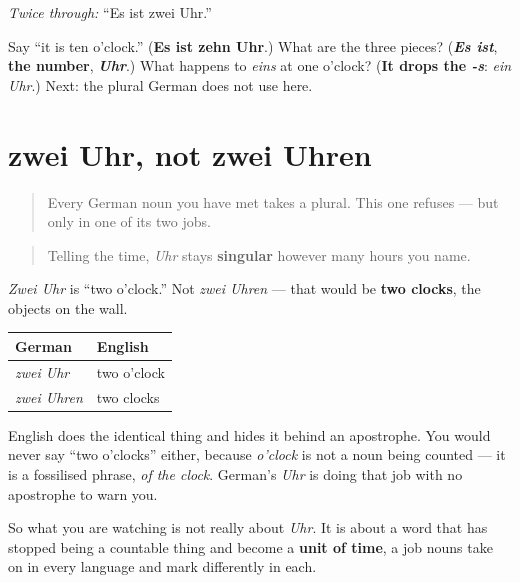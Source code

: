 \emph{Twice through:} \textquotedblleft{}Es ist zwei Uhr.\textquotedblright{}

\begin{tcolorbox}[breakable,colback=teal!4,colframe=teal!35!black,title={Before you move on}]
Say \textquotedblleft{}it is ten o'clock.\textquotedblright{} (\textbf{Es ist zehn Uhr}.) What are the three pieces? (\emph{\textbf{Es ist}}, \textbf{the number}, \emph{\textbf{Uhr}}.) What happens to \emph{eins} at one o'clock? (\textbf{It drops the \emph{-s}}: \emph{ein Uhr}.) Next: the plural German does not use here.
\end{tcolorbox}
\section[zwei Uhr, nicht zwei Uhren]{zwei Uhr, not zwei Uhren}

\label{lesson:GE-C08-uhr-ohne-plural}



\begin{quote}
Every German noun you have met takes a plural. This one refuses — but only in one of its two jobs.
\end{quote}

\begin{grammarlens}[title={Grammar Lens: the clock-reading Uhr does not count}]
\begin{quote}
Telling the time, \emph{Uhr} stays \textbf{singular} however many hours you name.
\end{quote}

\emph{Zwei Uhr} is \textquotedblleft{}two o'clock.\textquotedblright{} Not \emph{zwei Uhren} — that would be \textbf{two clocks}, the objects on the wall.

\noindent
\begin{tabularx}{\linewidth}{@{}>{\raggedright\arraybackslash}X>{\raggedright\arraybackslash}X@{}}
\toprule
\textbf{German} & \textbf{English} \\
\midrule
\emph{zwei Uhr} & two o'clock \\
\emph{zwei Uhren} & two clocks \\
\bottomrule
\end{tabularx}

English does the identical thing and hides it behind an apostrophe. You would never say \textquotedblleft{}two o'clocks\textquotedblright{} either, because \emph{o'clock} is not a noun being counted — it is a fossilised phrase, \emph{of the clock}. German's \emph{Uhr} is doing that job with no apostrophe to warn you.

So what you are watching is not really about \emph{Uhr}. It is about a word that has stopped being a countable thing and become a \textbf{unit of time}, a job nouns take on in every language and mark differently in each.
\end{grammarlens}

